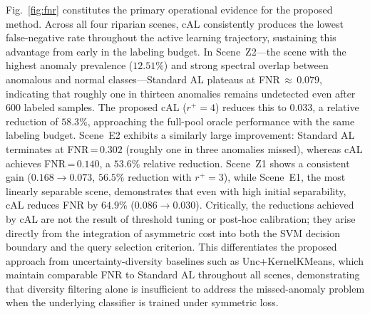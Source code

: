 Fig.~\ref{fig:fnr} constitutes the primary operational evidence for the
proposed method. Across all four riparian scenes, cAL consistently
produces the lowest false-negative rate throughout the active learning
trajectory, sustaining this advantage from early in the labeling budget.
In Scene~Z2---the scene with the highest anomaly prevalence ($12.51\%$)
and strong spectral overlap between anomalous and normal classes---Standard
AL plateaus at FNR\,$\approx$\,$0.079$, indicating that roughly one in
thirteen anomalies remains undetected even after 600 labeled samples.
The proposed cAL ($r^{+}=4$) reduces this to $0.033$, a relative
reduction of $58.3\%$, approaching the full-pool oracle performance
with the same labeling budget. Scene~E2 exhibits a similarly large
improvement: Standard AL terminates at FNR\,=\,$0.302$ (roughly one
in three anomalies missed), whereas cAL achieves FNR\,=\,$0.140$, a
$53.6\%$ relative reduction. Scene~Z1 shows a consistent gain
($0.168 \to 0.073$, $56.5\%$ reduction with $r^{+}=3$), while
Scene~E1, the most linearly separable scene, demonstrates that even
with high initial separability, cAL reduces FNR by $64.9\%$
($0.086 \to 0.030$). Critically, the reductions achieved by cAL are
not the result of threshold tuning or post-hoc calibration; they arise
directly from the integration of asymmetric cost into both the SVM
decision boundary and the query selection criterion. This differentiates
the proposed approach from uncertainty-diversity baselines such as
Unc+KernelKMeans, which maintain comparable FNR to Standard AL
throughout all scenes, demonstrating that diversity filtering alone
is insufficient to address the missed-anomaly problem when the
underlying classifier is trained under symmetric loss.


